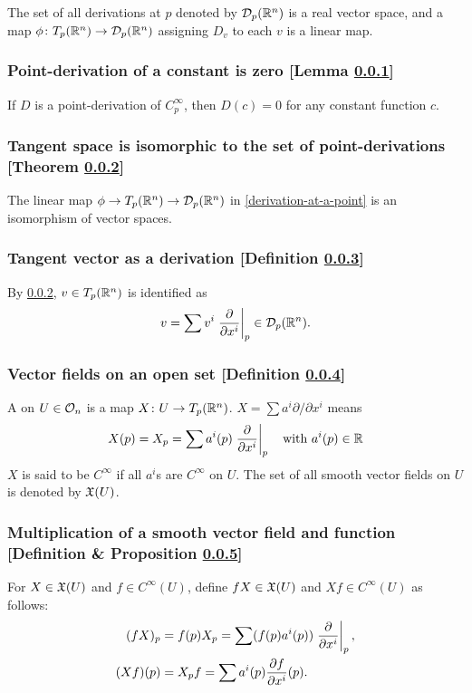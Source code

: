 The set of all derivations at $p$ denoted by $\mathcal{D}_p(\mathbb{R}^n)$ is a real vector space, and a map $\phi \colon T_p(\mathbb{R}^n) \to \mathcal{D}_p(\mathbb{R}^n)$ assigning $D_v$ to each $v$ is a linear map.

\subsubsection{Point-derivation of a constant is zero [Lemma \ref{point-derivation-of-a-constant-is-zero}]}\label{point-derivation-of-a-constant-is-zero}
If $D$ is a point-derivation of $C_p^\infty$, then $D(c) = 0$ for any constant function $c$.

\subsubsection{Tangent space is isomorphic to the set of point-derivations [Theorem \ref{tangent-space-is-isomorphic-to-the-set-of-point-derivations}]}\label{tangent-space-is-isomorphic-to-the-set-of-point-derivations}
The linear map $\phi \to T_p(\mathbb{R}^n) \to \mathcal{D}_p(\mathbb{R}^n)$ in \ref{derivation-at-a-point} is an isomorphism of vector spaces.

\subsubsection{Tangent vector as a derivation [Definition \ref{tangent-vector-as-a-derivation}]}\label{tangent-vector-as-a-derivation}
By \ref{tangent-space-is-isomorphic-to-the-set-of-point-derivations}, $v \in T_p(\mathbb{R}^n)$ is identified as
\[
v = \sum v^i \left.\pfr{}{x^i}\right|_p \in \mathcal{D}_p(\bb{R}^n).
\]

\subsubsection{Vector fields on an open set [Definition \ref{vector-fields-on-an-open-set}]}\label{vector-fields-on-an-open-set}
A  on $U \in \mathcal{O}_{n}$ is a map $X \colon U \to T_p(\mathbb{R}^n)$. $X = \sum a^i \partial / \partial x^i$ means
\[
X(p) = X_p = \sum a^i(p) \left. \pfr{}{x^i} \right|_p \quad \text{with } a^i (p) \in \bb{R}
\]
$X$ is said to be $C^\infty$ if all $a^i$s are $C^\infty$ on $U$. The set of all smooth vector fields on $U$ is denoted by $\mathfrak{X}(U)$.

\subsubsection{Multiplication of a smooth vector field and function [Definition \& Proposition \ref{multiplication-of-a-smooth-vector-field-and-function}]}\label{multiplication-of-a-smooth-vector-field-and-function}
For $X \in \mathfrak{X}(U)$ and $f \in C^\infty(U)$, define $fX \in \mathfrak{X}(U)$ and $Xf \in C^\infty(U)$ as follows:
\begin{align*}
(fX)_p &= f(p)X_p = \sum (f(p)a^i(p)) \left. \pfr{}{x^i}\right|_p,\\
(Xf)(p) &= X_p f = \sum a^i (p) \pfr{f}{x^i} (p).
\end{align*}

